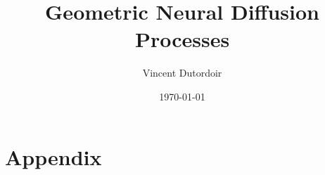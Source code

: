 \documentclass[mathserif,notheorems,aspectratio=169,xcolor=table]{beamer}
\title[Diffusion Models]{Geometric Neural Diffusion Processes}
\author{Vincent Dutordoir}
\date{\today}
\begin{document}
\begin{frame}
    \titlepage 
\end{frame}












\section*{Appendix}



% 

% 

\printbibliography
\end{document}
